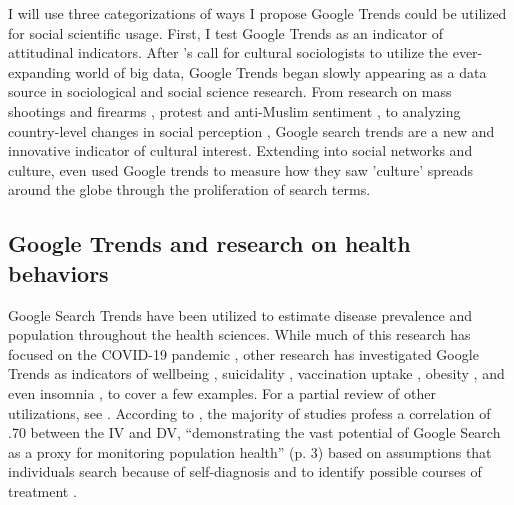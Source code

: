 I will use three categorizations of ways I propose Google Trends could be
utilized for social scientific usage. First, I test Google Trends as an
indicator of attitudinal indicators. After
\citet{bailCulturalEnvironmentMeasuring2014}'s call for cultural sociologists to
utilize the ever-expanding world of big data, Google Trends began slowly
appearing as a data source in sociological and social science research. From
research on mass shootings and firearms
\citep{brownsteinInternetSearchPatterns2020, semenzaInformationseekingWakeTragedy2020},
protest and anti-Muslim sentiment
\citep{bailUsingInternetSearch2018,barrieSearchingRacismGeorge2020,grossThereFergusonEffect2017},
to analyzing country-level changes in social perception \citep{reyes_etal18},
Google search trends are a new and innovative indicator of cultural interest.
Extending into social networks and culture,
\citet{bailPrestigeProximityPrejudice2019} even used Google trends to measure
how they saw 'culture' spreads around the globe through the proliferation of
search terms.

\subsection{Google Trends and research on health behaviors}

Google Search Trends have been utilized to estimate disease prevalence and
population throughout the health sciences. While much of this research has
focused on the COVID-19 pandemic \citep{jimenez_etal20,
jimenezCOVID19SymptomGoogle2020, limEstimatingInformationSeekingBehaviour2020,
mavraganiCOVID19PredictabilityUnited2020, nguyenGoogleTrendsAnalysis2020,
todorovaInternetBasedData2021, mingUnderstandingHealthCommunication2021}, other
research has investigated Google Trends as indicators of wellbeing
\citep{brodeurCOVID19LockdownsWellbeing2021,
carpiTwitterSubjectiveWellBeing2020, duCOVID19IncreasesOnline2020}, suicidality
\citep{burnettTimeTrendsPublic2020}, vaccination uptake
\citep{dalumhansenEnsembleLearnedVaccination2016}, obesity
\citep{sarigulNowcastingObesityUsing2014}, and even insomnia
\citep{zittingGoogleTrendsReveal2020}, to cover a few examples. For a partial
review of other utilizations, see \citet{nutiUseGoogleTrends2014}. According to
\citet{jaidkaInformationseekingVsSharing2021}, the majority of studies profess a
correlation of \> .70 between the IV and DV, ``demonstrating the vast potential
of Google Search as a proxy for monitoring population health'' (p. 3) based on
assumptions that individuals search because of self-diagnosis and to identify
possible courses of treatment \citep{dechoudhurySeekingSharingHealth2014}.


